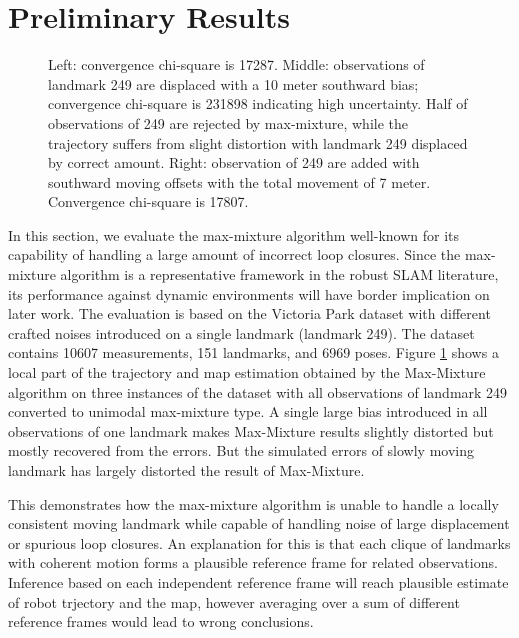 \section{Preliminary Results}

\begin{figure}[h]
\caption{Left: convergence chi-square is 17287. Middle: observations of
landmark 249 are displaced with a 10 meter southward bias; convergence
chi-square is 231898 indicating high uncertainty. Half of observations of 249
are rejected by max-mixture, while the trajectory suffers from slight
distortion with landmark 249 displaced by correct amount. Right: observation of 249 are
added with southward moving offsets with the total movement of 7 meter.
Convergence chi-square is 17807.}
\label{fig:baseline}
\end{figure}

In this section, we evaluate the max-mixture algorithm well-known for its
capability of handling a large amount of incorrect loop closures. Since the
max-mixture algorithm is a representative framework in the robust SLAM
literature, its performance against dynamic environments will have border
implication on later work. The evaluation is based on the Victoria Park dataset
with different crafted noises introduced on a single landmark (landmark 249).
The dataset contains 10607 measurements, 151 landmarks, and 6969 poses. Figure
\ref{fig:baseline} shows a local part of the trajectory and map estimation
obtained by the Max-Mixture algorithm on three instances of the dataset with
all observations of landmark 249 converted to unimodal max-mixture type. A
single large bias introduced in all observations of one landmark makes
Max-Mixture results slightly distorted but mostly recovered from the errors.
But the simulated errors of slowly moving landmark has largely distorted the
result of Max-Mixture.

This demonstrates how the max-mixture algorithm is unable to handle a locally
consistent moving landmark while capable of handling noise of large
displacement or spurious loop closures. An explanation for this is that each
clique of landmarks with coherent motion forms a plausible reference frame for
related observations. Inference based on each independent reference frame will
reach plausible estimate of robot trjectory and the map, however averaging over
a sum of different reference frames would lead to wrong conclusions.

